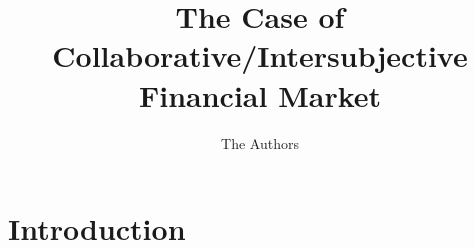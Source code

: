 \documentclass[acm,draft]{paper}
\begin{document}
\title{The Case of Collaborative/Intersubjective Financial Market}

\author{The Authors}

\begin{abstract}

\end{abstract}

\maketitle
\pagestyle{plain}

\section{Introduction}
\label{sec:intro}



\end{document}
